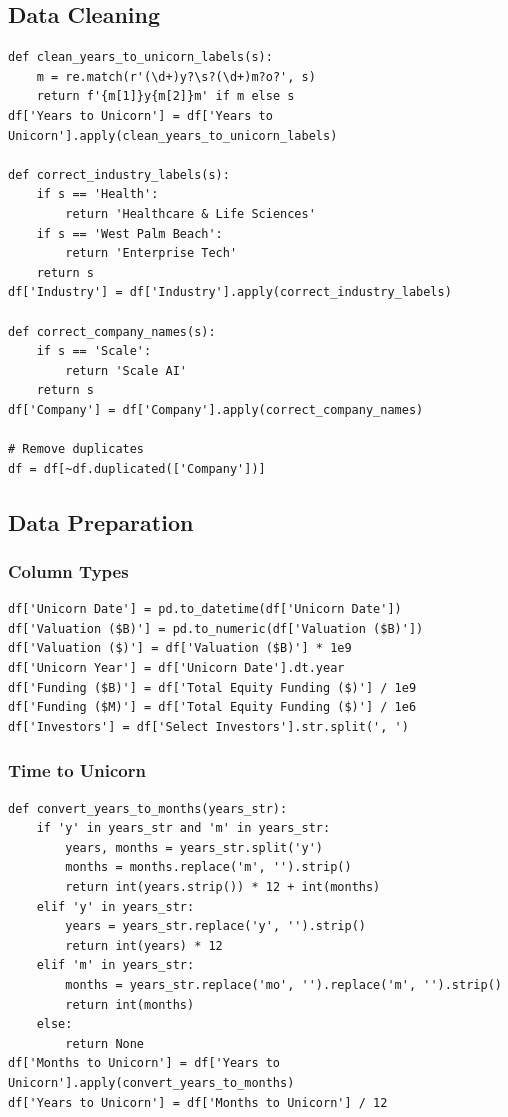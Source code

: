 \documentclass[a4paper,12pt]{article}
\begin{document}
\subsection{Data Cleaning}
\label{sec:org6c8ea24}
\begin{verbatim}
def clean_years_to_unicorn_labels(s):
    m = re.match(r'(\d+)y?\s?(\d+)m?o?', s)
    return f'{m[1]}y{m[2]}m' if m else s
df['Years to Unicorn'] = df['Years to Unicorn'].apply(clean_years_to_unicorn_labels)

def correct_industry_labels(s):
    if s == 'Health':
        return 'Healthcare & Life Sciences'
    if s == 'West Palm Beach':
        return 'Enterprise Tech'
    return s
df['Industry'] = df['Industry'].apply(correct_industry_labels)

def correct_company_names(s):
    if s == 'Scale':
        return 'Scale AI'
    return s
df['Company'] = df['Company'].apply(correct_company_names)

# Remove duplicates
df = df[~df.duplicated(['Company'])]
\end{verbatim}
\subsection{Data Preparation}
\label{sec:org3241ffc}
\subsubsection{Column Types}
\label{sec:orga6d5d8d}
\begin{verbatim}
df['Unicorn Date'] = pd.to_datetime(df['Unicorn Date'])
df['Valuation ($B)'] = pd.to_numeric(df['Valuation ($B)'])
df['Valuation ($)'] = df['Valuation ($B)'] * 1e9
df['Unicorn Year'] = df['Unicorn Date'].dt.year
df['Funding ($B)'] = df['Total Equity Funding ($)'] / 1e9
df['Funding ($M)'] = df['Total Equity Funding ($)'] / 1e6
df['Investors'] = df['Select Investors'].str.split(', ')
\end{verbatim}
\subsubsection{Time to Unicorn}
\label{sec:org4cf8932}
\begin{verbatim}
def convert_years_to_months(years_str):
    if 'y' in years_str and 'm' in years_str:
        years, months = years_str.split('y')
        months = months.replace('m', '').strip()
        return int(years.strip()) * 12 + int(months)
    elif 'y' in years_str:
        years = years_str.replace('y', '').strip()
        return int(years) * 12
    elif 'm' in years_str:
        months = years_str.replace('mo', '').replace('m', '').strip()
        return int(months)
    else:
        return None
df['Months to Unicorn'] = df['Years to Unicorn'].apply(convert_years_to_months)
df['Years to Unicorn'] = df['Months to Unicorn'] / 12
\end{verbatim}
\end{document}

